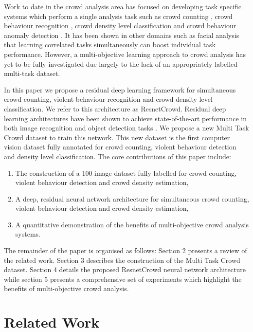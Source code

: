 \documentclass[10pt,twocolumn,letterpaper]{article}
\begin{document}
Work to date in the crowd analysis area has focused on developing task specific systems which perform a single analysis task such as crowd counting \cite{zhang2016single}, crowd behaviour recognition \cite{Kang2015}, crowd density level classification \cite{Fu2015} and crowd behaviour anomaly detection \cite{Li2014a}.  It has been shown in other domains such as facial analysis \cite{Ranjan2016}  that learning correlated tasks simultaneously can boost individual task performance. However, a multi-objective learning approach to crowd analysis has yet to be fully investigated due largely to the lack of an appropriately labelled multi-task dataset.


In this paper we propose a residual deep learning framework for simultaneous crowd counting, violent behaviour recognition and crowd density level classification. We refer to this architecture as ResnetCrowd. Residual deep learning architectures have been shown to achieve state-of-the-art performance in both image recognition and object detection tasks \cite{he2016deep}.  We propose a new Multi Task Crowd dataset to train this network. This new dataset is the first computer vision dataset fully annotated for crowd counting, violent behaviour detection and density level classification. The core contributions of this paper include:

\begin{enumerate}
  \item The construction of a 100 image dataset fully labelled for crowd counting, violent behaviour detection and crowd density estimation,
  \item A deep, residual neural network architecture for simultaneous crowd counting, violent behaviour detection and crowd density estimation,
  \item A quantitative demonstration of the benefits of multi-objective crowd analysis systems.

  
  
\end{enumerate}
The remainder of the paper is organised as follows: Section 2 presents a review of the related work. Section 3 describes the construction of the Multi Task Crowd dataset. Section 4 details the proposed ResnetCrowd neural network architecture while section 5 presents a comprehensive set of experiments which highlight the benefits of multi-objective crowd analysis.
\section{Related Work}
\end{document}
